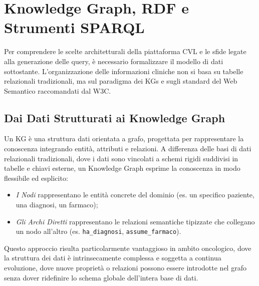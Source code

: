 \documentclass[12pt,a4paper,openright,twoside]{book}
\begin{document}
\section{Knowledge Graph, RDF e Strumenti SPARQL}
\label{sec:bg-kg-sparql}

Per comprendere le scelte architetturali della piattaforma CVL e le sfide legate
alla generazione delle query, è necessario formalizzare il modello di dati
sottostante. L'organizzazione delle informazioni cliniche non si basa su tabelle
relazionali tradizionali, ma sul paradigma dei \acfp{KG} e sugli standard del
Web Semantico raccomandati dal W3C.

\subsection{Dai Dati Strutturati ai Knowledge Graph}
Un \ac{KG} è una struttura dati orientata a grafo, progettata per rappresentare
la conoscenza integrando entità, attributi e relazioni. A differenza delle basi
di dati relazionali tradizionali, dove i dati sono vincolati a schemi rigidi
suddivisi in tabelle e chiavi esterne, un Knowledge Graph esprime la conoscenza
in modo flessibile ed esplicito:
\begin{itemize}
    \item \textit{I Nodi} rappresentano le entità concrete del dominio (es. un
          specifico paziente, una diagnosi, un farmaco);
    \item \textit{Gli Archi Diretti} rappresentano le relazioni semantiche
          tipizzate che collegano un nodo all'altro (es. \texttt{ha\_diagnosi},
          \texttt{assume\_farmaco}).
\end{itemize}

Questo approccio risulta particolarmente vantaggioso in ambito oncologico, dove
la struttura dei dati è intrinsecamente complessa e soggetta a continua
evoluzione, dove nuove proprietà o relazioni possono essere introdotte nel grafo
senza dover ridefinire lo schema globale dell'intera base di dati.
\end{document}
